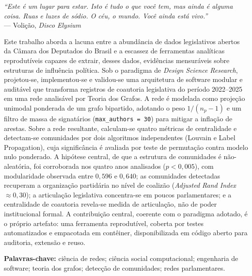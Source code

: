 \documentclass[
      12pt,
      a4paper,
      openright,
      oneside,
      chapter=TITLE,
      section=TITLE,
      english,
      french,
      spanish,
      brazilian
    ]{abntex2}
\begin{document}
    \begin{epigrafe}
        \vspace*{\fill}
        \begin{flushright}
            \textit{``Este é um lugar para estar. Isto é tudo o que você tem, mas ainda é alguma coisa. Ruas e luzes de sódio. O céu, o mundo. Você ainda está vivo.''}\\
            \vspace*{0.3cm}
            --- Volição, \textit{Disco Elysium}
        \end{flushright}
    \end{epigrafe}
    
    \begin{resumo}

    Este trabalho aborda a lacuna entre a abundância de dados legislativos abertos da Câmara dos Deputados do Brasil e a escassez de ferramentas analíticas reprodutíveis capazes de extrair, desses dados, evidências mensuráveis sobre estruturas de influência política. Sob o paradigma de \textit{Design Science Research}, projetou-se, implementou-se e validou-se uma arquitetura de software modular e auditável que transforma registros de coautoria legislativa do período 2022--2025 em uma rede analisável por Teoria dos Grafos. A rede é modelada como projeção unimodal ponderada de um grafo bipartido, adotando o peso $1/(n_p-1)$ e um filtro de massa de signatários (\texttt{max\_authors = 30}) para mitigar a inflação de arestas. Sobre a rede resultante, calculam-se quatro métricas de centralidade e detectam-se comunidades por dois algoritmos independentes (Louvain e Label Propagation), cuja significância é avaliada por teste de permutação contra modelo nulo ponderado. A hipótese central, de que a estrutura de comunidades é não-aleatória, foi corroborada nos quatro anos analisados ($p<0{,}005$), com modularidade observada entre $0{,}596$ e $0{,}640$; as comunidades detectadas recuperam a organização partidária no nível de coalizão (\textit{Adjusted Rand Index} $\approx 0{,}30$); a articulação legislativa concentra-se em poucos parlamentares; e a centralidade de coautoria revela-se medida de articulação, não de poder institucional formal. A contribuição central, coerente com o paradigma adotado, é o próprio artefato: uma ferramenta reprodutível, coberta por testes automatizados e empacotada em contêiner, disponibilizada em código aberto para auditoria, extensão e reuso.

        \vspace*{0.5cm}
        \noindent\textbf{{Palavras-chave: }} ciência de redes; ciência social computacional; engenharia de software; teoria dos grafos; detecção de comunidades; redes parlamentares.
    \end{resumo}
    
\end{document}
